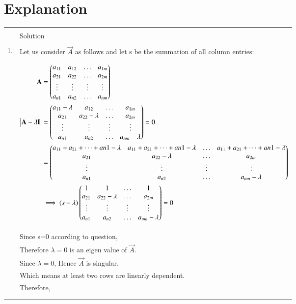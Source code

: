 \documentclass[journal,12pt]{IEEEtran}
\begin{document}
\section{\textbf{Explanation}}
\renewcommand{\thetable}{1}
\begin{longtable}{|l|l|}
\hline
\multirow{3}{*}{} & \\
option&Solution\\
\hline
&\\
1.&Let us consider $\vec{A}$ as follows and let s be the summation of all column entries:\\
&\parbox{6cm}{\begin{align*}
    \mathbf{A}&=\begin{pmatrix}a_{11}&a_{12}&\dots&a_{1m}\\a_{21}&a_{22}&\dots&a_{2m}\\\vdots&\vdots&\vdots&\vdots\\a_{n1}&a_{n2}&\dots&a_{nm}\end{pmatrix}\\
    \begin{vmatrix}\mathbf{A}-\lambda\mathbf{I}\end{vmatrix}&=\begin{pmatrix}a_{11}-\lambda&a_{12}&\dots&a_{1m}\\a_{21}&a_{22}-\lambda&\dots&a_{2m}\\\vdots&\vdots&\vdots&\vdots\\a_{n1}&a_{n2}&\dots&a_{nm}-\lambda\end{pmatrix}=0\\
    &=\begin{pmatrix}a_{11}+a_{21}+\dots+a{n1}-\lambda&a_{11}+a_{21}+\dots+a{n1}-\lambda&\dots&a_{11}+a_{21}+\dots+a{n1}-\lambda\\
    a_{21}&a_{22}-\lambda&\dots&a_{2m}\\\vdots&\vdots&\vdots&\vdots\\a_{n1}&a_{n2}&\dots&a_{nm}-\lambda\end{pmatrix}\\
    &\implies (s-\lambda)\begin{pmatrix}1&1&\dots&1\\a_{21}&a_{22}-\lambda&\dots&a_{2m}\\\vdots&\vdots&\vdots&\vdots\\a_{n1}&a_{n2}&\dots&a_{nm}-\lambda\end{pmatrix}=0\\
\end{align*}}\\
\hline
\pagebreak
\hline
&\\
& Since s=0 according to question,\\
&Therefore $\lambda=0$ is an eigen value of $\vec{A}$.\\
&Since $\lambda=0$, Hence $\vec{A}$ is singular.\\
&Which means at least two rows are linearly dependent.\\
&Therefore,\\
&\parbox{6cm}{\begin{align*}

\end{align*}}
\end{longtable}
\end{document}
